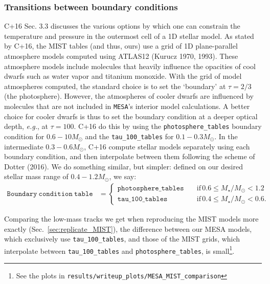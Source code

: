 \documentclass{article}
\begin{document}
\subsubsection{Transitions between boundary conditions}
C+16 Sec. 3.3 discusses the various options by which one can constrain the 
temperature and pressure in the outermost cell of a 1D stellar model.
As stated by C+16, the MIST tables (and thus, ours) use a grid 
of 1D plane-parallel atmosphere models computed using ATLAS12 (Kurucz 1970, 
1993). These atmosphere models include molecules that heavily influence the 
opacities of cool dwarfs such as water vapor and titanium monoxide.
With the grid of model atmospheres computed, the standard choice is to set the 
`boundary' at $\tau=2/3$ (the photosphere).
However, the atmospheres of cooler dwarfs are influenced by molecules that are 
not included in \texttt{MESA}'s interior model calculations.
A better choice for cooler dwarfs is thus to set the boundary condition 
at a deeper optical depth, \textit{e.g.}, at $\tau=100$.
C+16 do this by using the \texttt{photosphere\_tables} boundary condition 
for $0.6-10M_\odot$ and the \texttt{tau\_100\_tables} for $0.1-0.3M_\odot$. In 
the intermediate $0.3-0.6M_\odot$, C+16 compute stellar models separately 
using each boundary condition, and then interpolate between them following the 
scheme of Dotter (2016).
We do something similar, but simpler: defined on our desired stellar mass range 
of $0.4-1.2M_\odot$, we say: 
\begin{align}
\mathtt{Boundary\ condition\ table} &=
\begin{cases}
\mathtt{photosphere\_tables} \quad 
&\mathrm{if}\,0.6\leq M_\star/M_\odot<1.2\\
\mathtt{tau\_100\_tables} \quad 
&\mathrm{if}\,0.4\leq M_\star/M_\odot<0.6.
\end{cases}
\end{align}

Comparing the low-mass tracks we get when reproducing the MIST models more
exactly (Sec.~\ref{sec:replicate_MIST}), the difference between our MESA
models, which exclusively use \texttt{tau\_100\_tables}, and those of the MIST
grids, which interpolate between \texttt{tau\_100\_tables} and
\texttt{photosphere\_tables}, is small\footnote{See the plots in
\texttt{results/writeup\_plots/MESA\_MIST\_comparison}}.
\end{document}

